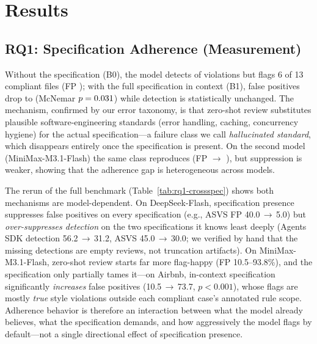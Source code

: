 \documentclass[11pt]{article}
\begin{document}
\section{Results}
\label{sec:results}

\subsection{RQ1: Specification Adherence (Measurement)}
Without the specification (B0), the model detects \dsBzeroDet{} of violations but flags
6 of 13 compliant files (FP \dsBzeroFP); with the full specification in context (B1),
false positives drop to \dsBoneFP{} (McNemar $p=0.031$) while detection is statistically
unchanged. The mechanism, confirmed by our error taxonomy, is that zero-shot review
substitutes plausible software-engineering standards (error handling, caching,
concurrency hygiene) for the actual specification---a failure class we call
\emph{hallucinated standard}, which disappears entirely once the specification is
present. On the second model (MiniMax-M3.1-Flash) the same class reproduces
(FP \mxBzeroFP{} $\rightarrow$ \mxBoneFP), but suppression is weaker, showing that the
adherence gap is heterogeneous across models.

\begin{table}[t]
\centering
\caption{Cross-specification replication of the adherence gap (I6 full rerun:
B0 vs.\ B1 per specification and model; detection on violations, FP on compliant
code; $p$ = exact binomial McNemar on the compliant subset, B0 vs.\ B1).}
\label{tab:rq1-crossspec}

\end{table}

The rerun of the full benchmark (Table~\ref{tab:rq1-crossspec}) shows both
mechanisms are model-dependent. On DeepSeek-Flash, specification presence
suppresses false positives on every specification (e.g., ASVS FP 40.0\,$\rightarrow$\,5.0)
but \emph{over-suppresses detection} on the two specifications it knows least
deeply (Agents SDK detection 56.2\,$\rightarrow$\,31.2, ASVS 45.0\,$\rightarrow$\,30.0;
we verified by hand that the missing detections are empty reviews, not
truncation artifacts). On MiniMax-M3.1-Flash, zero-shot review starts far more
flag-happy (FP 10.5--93.8\%), and the specification only partially tames it---on
Airbnb, in-context specification significantly \emph{increases} false positives
(10.5\,$\rightarrow$\,73.7, $p<0.001$), whose flags are mostly \emph{true} style
violations outside each compliant case's annotated rule scope. Adherence
behavior is therefore an interaction between what the model already believes,
what the specification demands, and how aggressively the model flags by
default---not a single directional effect of specification presence.
\end{document}
